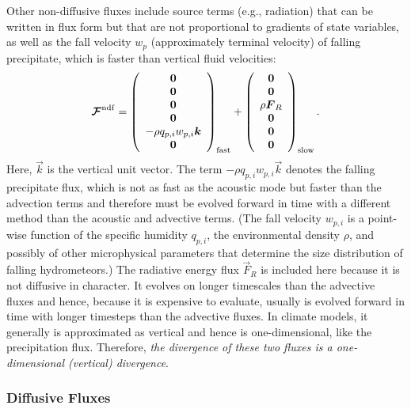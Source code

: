 \documentclass{article}
\begin{document}
{Other non-diffusive fluxes include source terms (e.g., radiation) that can be written in flux form but that are not proportional to gradients of state variables, as well as the fall velocity $w_p$ (approximately terminal velocity) of falling precipitate, which is faster than vertical fluid velocities:
\begin{equation}
\boldsymbol{{\mathcal{F}}}^{\mathrm{ndf}} = 
\left( \begin{array}{c}
\boldsymbol{{0}} \\
\boldsymbol{{0}} \\
\boldsymbol{{0}} \\
\boldsymbol{{0}} \\
-\rho q_{p,i} w_{p, i} \boldsymbol{{k}} \\
\boldsymbol{{0}} 
\end{array}
\right)_{\mathrm{fast}} + 
\left( \begin{array}{c}
\boldsymbol{{0}} \\
\boldsymbol{{0}} \\
\rho \boldsymbol{{F}}_R\\
\boldsymbol{{0}} \\
\boldsymbol{{0}} \\
\boldsymbol{{0}} 
\end{array}
\right)_{\mathrm{slow}}.
\label{eq:ndf_flux}
\end{equation}
Here, $\vec{k}$ is the vertical unit vector.  The term $-\rho q_{p,i} w_{p, i} \vec{k}$ denotes the falling precipitate flux, which is not as fast as the acoustic mode but faster than the advection terms and therefore must be evolved forward in time with a different method than the acoustic and advective terms. (The fall velocity $w_{p, i}$ is a point-wise function of the specific humidity $q_{p,i}$, the environmental density $\rho$, and possibly of other microphysical parameters that determine the size distribution of falling hydrometeors.) The radiative energy flux $\vec{F}_R$ is included here because it is not diffusive in character. It evolves on longer timescales than the advective fluxes and hence, because it is expensive to evaluate, usually is evolved forward in time with longer timesteps than the advective fluxes. In climate models, it generally is approximated as vertical and hence is one-dimensional, like the precipitation flux. Therefore, \emph{the divergence of these two fluxes is a one-dimensional (vertical) divergence}.

\subsubsection{Diffusive Fluxes}

}
\end{document}
